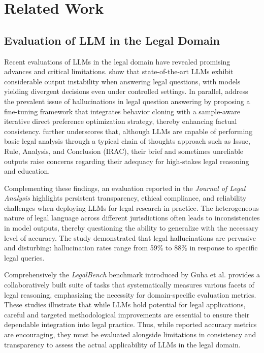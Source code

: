 \section{Related Work}
\subsection{Evaluation of LLM in the Legal Domain}
Recent evaluations of LLMs in the legal domain have revealed promising advances and critical limitations. \citet{blairstanek2025llms} show that state-of-the-art LLMs exhibit considerable output instability when answering legal questions, with models yielding divergent decisions even under controlled settings. In parallel, \citet{hu2025finetuning} address the prevalent issue of hallucinations in legal question answering by proposing a fine-tuning framework that integrates behavior cloning with a sample-aware iterative direct preference optimization strategy, thereby enhancing factual consistency. \citet{peoples2025ai} further underscores that, although LLMs are capable of performing basic legal analysis through a typical chain of thoughts approach such as Issue, Rule, Analysis, and Conclusion (IRAC), their brief and sometimes unreliable outputs raise concerns regarding their adequacy for high-stakes legal reasoning and education. 

Complementing these findings, an evaluation reported in the \textit{Journal of Legal Analysis} \cite{oup2025} highlights persistent transparency, ethical compliance, and reliability challenges when deploying LLMs for legal research in practice. The heterogeneous nature of legal language across different jurisdictions often leads to inconsistencies in model outputs, thereby questioning the ability to generalize with the necessary level of accuracy. The study demonstrated that legal hallucinations are pervasive and disturbing: hallucination rates range from 59\% to 88\% in response to specific legal queries. 

Comprehensively the \textit{LegalBench} benchmark introduced by Guha et al. \cite{legalbench-2023} provides a collaboratively built suite of tasks that systematically measures various facets of legal reasoning, emphasizing the necessity for domain-specific evaluation metrics. These studies illustrate that while LLMs hold potential for legal applications, careful and targeted methodological improvements are essential to ensure their dependable integration into legal practice. Thus, while reported accuracy metrics are encouraging, they must be evaluated alongside limitations in consistency and transparency to assess the actual applicability of LLMs in the legal domain.

